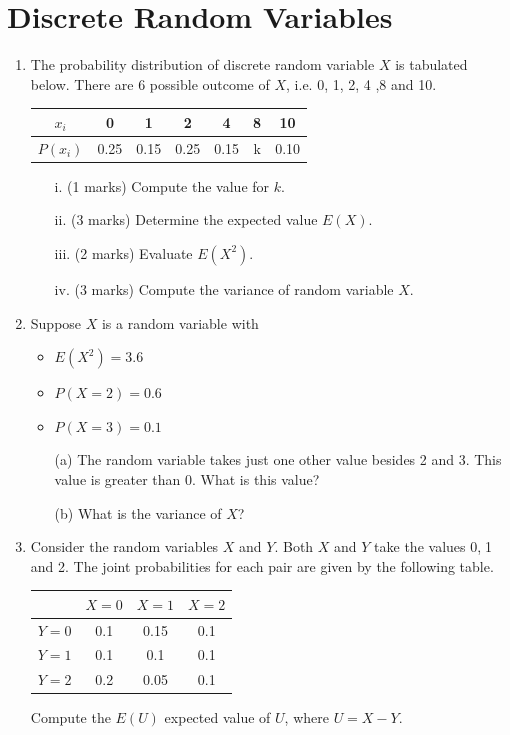 \documentclass[12pt]{report}
\begin{document}
\section{Discrete Random Variables}
	\begin{enumerate}
		\item  The probability distribution of discrete random variable $X$ is tabulated below. There are 6 possible outcome of $X$, i.e. 0, 1, 2, 4 ,8 and 10.
		\begin{center}
			\begin{tabular}{|c||c|c|c|c|c|c|}
				\hline
				$x_i$  & 0 & 1 & 2 & 4 & 8 & 10 \\\hline
				$P(x_i)$ & 0.25 & 0.15 & 0.25 & 0.15 & k & 0.10\\
				\hline
			\end{tabular}
		\end{center}
		
		\begin{itemize}
			\item[i.] (1 marks) Compute the value for $k$.
			\item[ii.] (3 marks) Determine the expected value $E(X)$.
			\item[iii.] (2 marks) Evaluate $E(X^2)$.
			\item[iv.] (3 marks) Compute the variance of random variable $X$.
		\end{itemize}
		\item 
		Suppose $X$ is a random variable with 
		\begin{itemize}
			\item $E(X^2)=3.6$
			\item $P(X=2)=0.6$
			\item $P(X=3)=0.1$
		\end{itemize}
		
		\begin{itemize}
			\item[(a)] The random variable takes just one other value besides 2 and 3. This value is greater than 0. What is this value?
			\item[(b)] What is the variance of $X$?
		\end{itemize}
		
		
		\item Consider the random variables $X$ and $Y$. Both $X$ and $Y$ take the values 0,$\;$1 and 2. 
		The joint probabilities for each pair are given by the following table.
		\begin{center}
			\begin{tabular}{|c|c|c|c|}
				\hline  & $X=0$ & $X=1$ & $X=2$ \\ 
				\hline $Y=0$ & 0.1 & 0.15 & 0.1 \\ 
				\hline $Y=1$ & 0.1 & 0.1 & 0.1 \\ 
				\hline $Y=2$ & 0.2 & 0.05 & 0.1 \\ 
				\hline 
			\end{tabular} 
		\end{center}
		Compute the $E(U)$ expected value of $U$, where $U=X-Y$.
	\end{enumerate}
\end{document}
